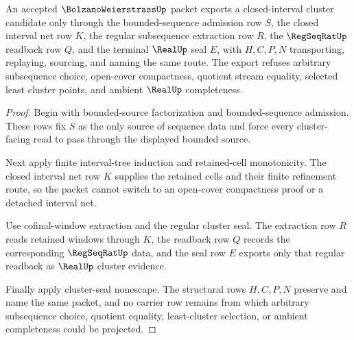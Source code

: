\begin{theorem}
\label{thm:bolzano-weierstrass-closed-interval-cluster-export}
An accepted $\BolzanoWeierstrassUp$ packet exports a closed-interval cluster candidate only through the bounded-sequence admission row $S$, the closed interval net row $K$, the regular subsequence extraction row $R$, the $\RegSeqRatUp$ readback row $Q$, and the terminal $\RealUp$ seal $E$, with $H,C,P,N$ transporting, replaying, sourcing, and naming the same route. The export refuses arbitrary subsequence choice, open-cover compactness, quotient stream equality, selected least cluster points, and ambient $\RealUp$ completeness.
\end{theorem}
\begin{proof}
Begin with bounded-source factorization and bounded-sequence admission. These rows fix $S$ as the only source of sequence data and force every cluster-facing read to pass through the displayed bounded source.

Next apply finite interval-tree induction and retained-cell monotonicity. The closed interval net row $K$ supplies the retained cells and their finite refinement route, so the packet cannot switch to an open-cover compactness proof or a detached interval net.

Use cofinal-window extraction and the regular cluster seal. The extraction row $R$ reads retained windows through $K$, the readback row $Q$ records the corresponding $\RegSeqRatUp$ data, and the seal row $E$ exports only that regular readback as $\RealUp$ cluster evidence.

Finally apply cluster-seal nonescape. The structural rows $H,C,P,N$ preserve and name the same packet, and no carrier row remains from which arbitrary subsequence choice, quotient equality, least-cluster selection, or ambient completeness could be projected.
\end{proof}

